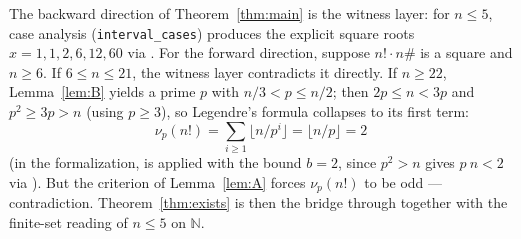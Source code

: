 \documentclass[11pt]{article}
\theoremstyle{definition}
\begin{document}
The backward direction of Theorem~\ref{thm:main} is the witness layer: for
$n \le 5$, case analysis (\texttt{interval\_cases}) produces the explicit
square roots $x = 1, 1, 2, 6, 12, 60$ via . For
the forward direction, suppose $n! \cdot n\#$ is a square and $n \ge 6$. If
$6 \le n \le 21$, the witness layer contradicts it directly. If $n \ge 22$,
Lemma~\ref{lem:B} yields a prime $p$ with $n/3 < p \le n/2$; then
$2p \le n < 3p$ and $p^{2} \ge 3p > n$ (using $p \ge 3$), so Legendre's
formula collapses to its first term:
\[
\nu_p(n!) = \sum_{i \ge 1} \lfloor n/p^{i} \rfloor = \lfloor n/p \rfloor = 2
\]
(in the formalization,  is applied with
the bound $b = 2$, since $p^{2} > n$ gives  $p\ n < 2$ via
). But the criterion of Lemma~\ref{lem:A} forces
$\nu_p(n!)$ to be odd --- contradiction. Theorem~\ref{thm:exists} is then the
bridge through  together with the finite-set
reading of $n \le 5$ on $\mathbb{N}$.
\end{document}
